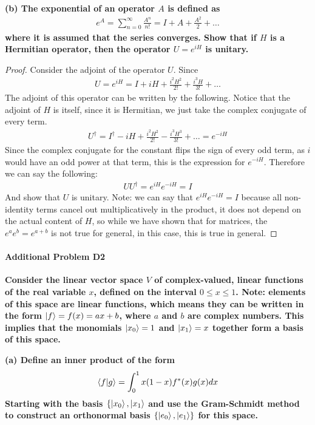 \documentclass{article}
\begin{document}
\textbf{(b) The exponential of an operator $A$ is defined as}
\begin{align*}
e^A = \sum_{n=0}^{\infty} \frac{A^n}{n!} = I + A + \frac{A^2}{2} + \ldots
\end{align*}
\textbf{where it is assumed that the series converges. Show that if $H$ is a Hermitian operator, then the operator $U = e^{iH}$ is unitary.}

\begin{proof}
    Consider the adjoint of the operator $U$. Since 
    \begin{align}
        U = e^{iH} = I + iH + \frac{i^2 H^2}{2!} + \frac{i^3H}{3!} + \ldots
    \end{align}
    The adjoint of this operator can be written by the following. Notice that the adjoint of $H$ is itself, since it is Hermitian, we just take the complex conjugate of every term.
    \begin{align}
        U^\dagger = I^\dagger - iH + \frac{i^2 H^2}{2!} - \frac{i^3H^3}{3!} + \ldots = e^{-iH}
    \end{align}
    Since the complex conjugate for the constant flips the sign of every odd term, as $i$ would have an odd power at that term, this is the expression for $e^{-iH}$. Therefore we can say the following:
    \begin{align}
        UU^\dagger = e^{iH} e^{-iH} = I
    \end{align}
    And show that $U$ is unitary. Note: we can say that $e^{iH} e^{-iH} = I$ because all non-identity terms cancel out multiplicatively in the product, it does not depend on the actual content of $H$, so while we have shown that for matrices, the $e^a e^b = e^{a+b}$ is not true for general, in this case, this is true in general.
\end{proof}

\paragraph{Additional Problem D2}
\textbf{Consider the linear vector space $V$ of complex-valued, linear functions of the real variable $x$, defined on the interval $0 \leq x \leq 1$. Note: elements of this space are linear functions, which means they can be written in the form $\ket{f}=f(x)=ax+b$, where $a$ and $b$ are complex numbers. This implies that the monomials $\ket{x_0}=1$ and $\ket{x_1}=x$ together form a basis of this space. }

\textbf{(a) Define an inner product of the form}
\begin{align*}
    \bra{f}\ket{g} = \int_0^1 x(1-x)f^*(x)g(x)dx
\end{align*}
\textbf{Starting with the basis $\{\ket{x_0}, \ket{x_1}$ and use the Gram-Schmidt method to construct an orthonormal basis $\{\ket{e_0}, \ket{e_1}\}$ for this space. }
\end{document}
